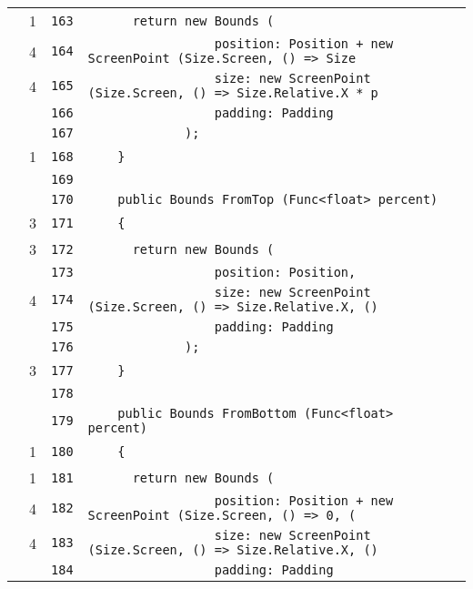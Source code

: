 \documentclass[a4paper,10pt]{article}
\begin{document}
\begin{longtable}[l]{lrrl}
\cellcolor{green} & 1 & \verb~163~ & \verb~      return new Bounds (~\\
\cellcolor{green} & 4 & \verb~164~ & \verb~                 position: Position + new ScreenPoint (Size.Screen, () => Size~\\
\cellcolor{green} & 4 & \verb~165~ & \verb~                 size: new ScreenPoint (Size.Screen, () => Size.Relative.X * p~\\
\cellcolor{gray} &  & \verb~166~ & \verb~                 padding: Padding~\\
\cellcolor{gray} &  & \verb~167~ & \verb~             );~\\
\cellcolor{green} & 1 & \verb~168~ & \verb~    }~\\
\cellcolor{gray} &  & \verb~169~ & \verb~~\\
\cellcolor{gray} &  & \verb~170~ & \verb~    public Bounds FromTop (Func<float> percent)~\\
\cellcolor{green} & 3 & \verb~171~ & \verb~    {~\\
\cellcolor{green} & 3 & \verb~172~ & \verb~      return new Bounds (~\\
\cellcolor{gray} &  & \verb~173~ & \verb~                 position: Position,~\\
\cellcolor{green} & 4 & \verb~174~ & \verb~                 size: new ScreenPoint (Size.Screen, () => Size.Relative.X, ()~\\
\cellcolor{gray} &  & \verb~175~ & \verb~                 padding: Padding~\\
\cellcolor{gray} &  & \verb~176~ & \verb~             );~\\
\cellcolor{green} & 3 & \verb~177~ & \verb~    }~\\
\cellcolor{gray} &  & \verb~178~ & \verb~~\\
\cellcolor{gray} &  & \verb~179~ & \verb~    public Bounds FromBottom (Func<float> percent)~\\
\cellcolor{green} & 1 & \verb~180~ & \verb~    {~\\
\cellcolor{green} & 1 & \verb~181~ & \verb~      return new Bounds (~\\
\cellcolor{green} & 4 & \verb~182~ & \verb~                 position: Position + new ScreenPoint (Size.Screen, () => 0, (~\\
\cellcolor{green} & 4 & \verb~183~ & \verb~                 size: new ScreenPoint (Size.Screen, () => Size.Relative.X, ()~\\
\cellcolor{gray} &  & \verb~184~ & \verb~                 padding: Padding~\\

\end{longtable}
\end{document}
